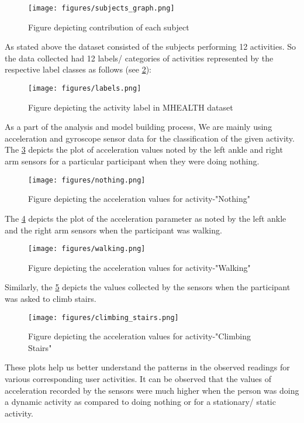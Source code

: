 \documentclass[acmtog]{acmart}
\begin{document}
\begin{figure}[H]
    \centering
    \texttt{[image: figures/subjects\_graph.png]}
    \caption{Figure depicting contribution of each subject}
    \label{fig:subjects_graph}
 \end{figure}

As stated above the dataset consisted of the subjects performing 12 activities. So the data collected had 12 labels/ categories of activities represented by the respective label classes as follows (see \cref{fig:labels}):
\begin{figure}[H]
    \centering
    \texttt{[image: figures/labels.png]}
    \caption{Figure depicting the activity label in MHEALTH dataset}
    \label{fig:labels}
 \end{figure}
As a part of the analysis and model building process, We are mainly using acceleration and gyroscope sensor data for the classification of the given activity. The \cref{fig:nothing} depicts the plot of acceleration values noted by the left ankle and right arm sensors for a particular participant when they were doing nothing.
\begin{figure}[H]
    \centering
    \texttt{[image: figures/nothing.png]}
    \caption{Figure depicting the acceleration values for activity-"Nothing"}
    \label{fig:nothing}
 \end{figure}
The \cref{fig:walking} depicts the plot of the acceleration parameter as noted by the left ankle and the right arm sensors when the participant was walking.
\begin{figure}[H]
    \centering
    \texttt{[image: figures/walking.png]}
    \caption{Figure depicting the acceleration values for activity-"Walking"}
    \label{fig:walking}
 \end{figure}
Similarly, the \cref{fig:climbing_stairs} depicts the values collected by the sensors when the participant was asked to climb stairs.
\begin{figure}[H]
    \centering
    \texttt{[image: figures/climbing\_stairs.png]}
    \caption{Figure depicting the acceleration values for activity-"Climbing Stairs"}
    \label{fig:climbing_stairs}
 \end{figure}

These plots help us better understand the patterns in the observed readings for various corresponding user activities. It can be observed that the values of acceleration recorded by the sensors were much higher when the person was doing a dynamic activity as compared to doing nothing or for a stationary/ static activity.
\end{document}
